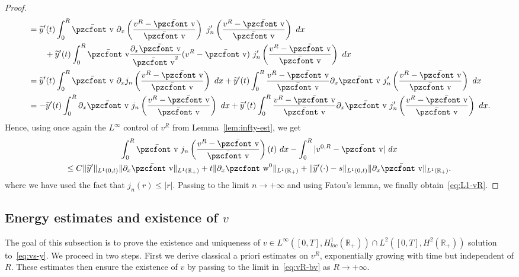 \documentclass[10pt]{amsart}
\theoremstyle{definition}\newtheorem{defi}[theo]{Definition}\newtheorem{rema}[theo]{Remark}\newtheorem{exam}[theo]{Example}\newtheorem{exem}[theo]{Example}\newtheorem{nota}[theo]{Notation}
\newcommand{\mathpzc}[1]{\text{\pzcfont #1}}
\newcommand{\R}{\mathbb{R}}
\newcommand{\bv}{\bar{\mathpzc{v}}}
\newcommand{\tw}{\mathpzc{w}}
\newcommand{\ty}{\widetilde{y}}
\begin{document}
\begin{proof}
\begin{multline*}
\begin{aligned}
& = \ty'(t) \int_0^R \bv \ \partial_x\left(\frac{v^R -\bv}{\bv}\right)\ j_n'\left(\frac{v^R -\bv}{\bv}\right) \ dx \\
&\qquad+ \ty'(t) \int_0^R \bv \frac{\partial_x \bv}{\bv^2} (v^R -\bv)\ j_n'\left(\frac{v^R -\bv}{\bv}\right) \ dx \\
& = \ty'(t) \int_0^R \bv \ \partial_x j_n\left(\frac{v^R -\bv}{\bv}\right) \ dx + \ty'(t) \int_0^R \dfrac{v^R -\bv}{\bv} \partial_x \bv \ j'_n\left(\frac{v^R -\bv}{\bv}\right) \ dx \\
& = - \ty'(t) \int_0^R \partial_x \bv \ j_n\left(\frac{v^R-\bv}{\bv}\right) \ dx + \ty'(t) \int_0^R \dfrac{v^R -\bv}{\bv} \partial_x \bv \ j'_n\left(\frac{v^R -\bv}{\bv}\right) \ dx.
\end{aligned}
\end{multline*}
Hence, using once again the $L^\infty$ control of $v^R$ from Lemma~\ref{lem:infty-est}, we get
\begin{multline*}
\int_0^R \bv \ j_n\left(\frac{v^R -\bv}{\bv}\right)(t) \ dx - \int_0^R |v^{0,R} -\bv| \ dx \\
\leq C \|\ty'\|_{L^1(0,t)} \|\partial_x \bv\|_{L^1(\R_+)} + t \|\partial_x \tw^0\|_{L^1(\R_+)} + \|\ty'(\cdot) -s\|_{L^1(0,t)} \|\partial_x \bv\|_{L^1(\R_+)}.
\end{multline*}
where we have used the fact that $j_n(r) \leq |r|$. Passing to the limit $n\to +\infty$ and using Fatou’s lemma, we finally obtain~\eqref{eq:L1-vR}.
\end{proof}



\subsection{Energy estimates and existence of \texorpdfstring{$v$}{v}}\label{sec:existence-v}



The goal of this subsection is to prove the existence and uniqueness of $v \in L^\infty([0,T], H^1_{loc}(\R_+))\cap L^2([0,T], H^2(\R_+))$ solution to~\eqref{eq:vs-y}. We proceed in two steps. First we derive classical a priori estimates on $v^R$, exponentially growing with time but independent of $R$. These estimates then ensure the existence of $v$ by passing to the limit in~\eqref{eq:vR-bv} as $R\to +\infty$.
\end{document}
